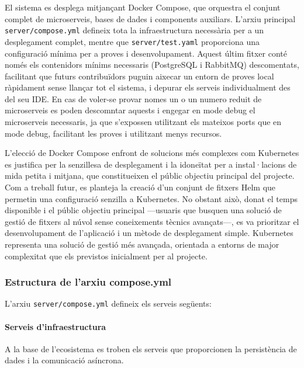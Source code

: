 El sistema es desplega mitjançant Docker Compose, que orquestra el conjunt complet de microserveis, bases de dades i components auxiliars. L'arxiu principal \texttt{server/compose.yml} defineix tota la infraestructura necessària per a un desplegament complet, mentre que \texttt{server/test.yaml} proporciona una configuració mínima per a proves i desenvolupament. Aquest últim fitxer conté només els contenidors mínims necessaris (PostgreSQL i RabbitMQ) descomentats, facilitant que futurs contribuïdors puguin aixecar un entorn de proves local ràpidament sense llançar tot el sistema, i depurar els serveis individualment des del seu IDE. En cas de voler-se provar nomes un o un numero reduit de microserveis es poden descomntar aquests i engegar en mode debug el microserveis necessaris, ja que s'expossen utilitzant els mateixos ports que en mode debug, facilitant les proves i utilitzant menys recursos.

L'elecció de Docker Compose enfront de solucions més complexes com Kubernetes es justifica per la senzillesa de desplegament i la idoneïtat per a instal·lacions de mida petita i mitjana, que constitueixen el públic objectiu principal del projecte. Com a treball futur, es planteja la creació d'un conjunt de fitxers Helm que permetin una configuració senzilla a Kubernetes. No obstant això, donat el temps disponible i el públic objectiu principal —usuaris que busquen una solució de gestió de fitxers al núvol sense coneixements tècnics avançats—, es va prioritzar el desenvolupament de l'aplicació i un mètode de desplegament simple. Kubernetes representa una solució de gestió més avançada, orientada a entorns de major complexitat que els previstos inicialment per al projecte.

\subsubsection{Estructura de l'arxiu compose.yml}

L'arxiu \texttt{server/compose.yml} defineix els serveis següents:

\paragraph{Serveis d'infraestructura}

A la base de l'ecosistema es troben els serveis que proporcionen la persistència de dades i la comunicació asíncrona.

